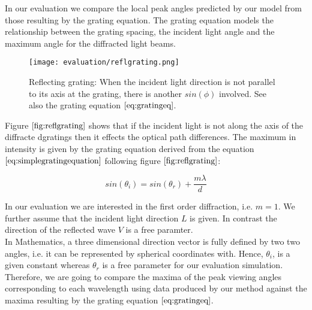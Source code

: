 In our evaluation we compare the local peak angles predicted by our model from those resulting by the grating equation. The grating equation models the relationship between the grating spacing, the incident light angle and the maximum angle for the diffracted light beams. 

\begin{figure}[H]
  \centering
  \texttt{[image: evaluation/reflgrating.png]}
  \caption[Reflective Grating]{Reflecting grating: When the incident light direction is not parallel to its axis at the grating, there is another $sin(\phi)$ involved. See also the grating equation $\ref{eq:gratingeq}$.}
  \label{fig:reflgrating}
\end{figure}

Figure $\ref{fig:reflgrating}$ shows that if the incident light is not along the axis of the diffracte dgratings then it effects the optical path differences. The maximum in intensity is given by the grating equation derived from the equation $\ref{eq:simplegratingequation}$ following figure $\ref{fig:reflgrating}$: 

\begin{equation}
  sin(\theta_i) = sin(\theta_r) + \frac{m \lambda}{d}
\label{eq:gratingeq}
\end{equation}

In our evaluation we are interested in the first order diffraction, i.e. $m=1$. We further assume that the incident light direction $L$ is given. In contrast the direction of the reflected wave $V$ is a free paramter. \\

In Mathematics, a three dimensional direction vector is fully defined by two two angles, i.e. it can be represented by spherical coordinates with. Hence, $\theta_i$, is a given constant whereas $\theta_r$ is a free parameter for our evaluation simulation. Therefore, we are going to compare the maxima of the peak viewing angles corresponding to each wavelength using data produced by our method against the maxima resulting by the grating equation $\ref{eq:gratingeq}$.

